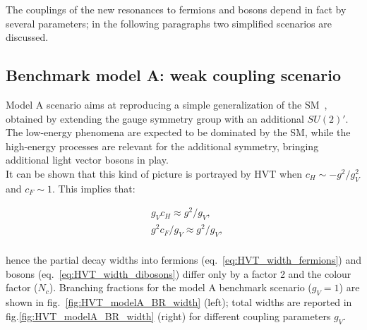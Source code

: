 \vspace*{1\baselineskip}

\noindent The couplings of the new resonances to fermions and bosons depend in fact by several parameters; in the following paragraphs two simplified scenarios are discussed.

\clearpage

\subsection{Benchmark model A: weak coupling scenario}
\label{sec:theory_HVT_A}
Model A scenario aims at reproducing a simple generalization of the SM~\cite{Barger:1980ix}, obtained by extending the gauge symmetry group with an additional $SU(2)'$. The low-energy phenomena are expected to be dominated by the SM, while the high-energy processes are relevant for the additional symmetry, bringing additional light vector bosons in play.\\
It can be shown that this kind of picture is portrayed by HVT when $c_H \sim -g^2/g_V^2$ and $c_F \sim 1$. This implies that:

\begin{equation}
\begin{split}
 & g_V c_H \approx g^2/g_V,\\
 & g^2 c_F/g_V \approx g^2/g_V,\\
\end{split}
\label{eq:theory_HVT_modelA}
\end{equation}

\noindent hence the partial decay widths into fermions (eq.~\ref{eq:HVT_width_fermions}) and bosons (eq.~\ref{eq:HVT_width_dibosons}) differ only by a factor 2 and the colour factor ($N_c$). Branching fractions for the model A benchmark scenario ($g_V =1$) are shown in fig.~\ref{fig:HVT_modelA_BR_width} (left); total widths are reported in fig.\ref{fig:HVT_modelA_BR_width} (right) for different coupling parameters $g_V$.  

